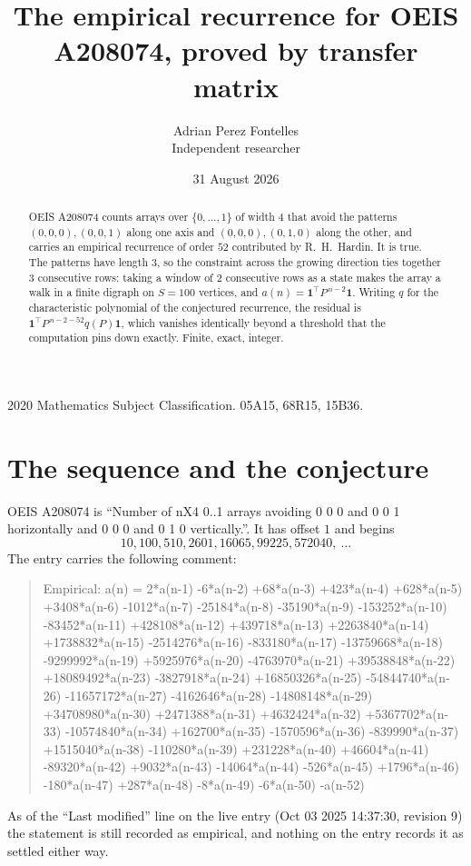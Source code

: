 \documentclass[11pt,a4paper]{article}
\title{The empirical recurrence for OEIS A208074, proved by transfer matrix}
\author{Adrian Perez Fontelles\\ \small Independent researcher}
\date{31 August 2026}
\theoremstyle{plain}
\theoremstyle{definition}
\begin{document}
\maketitle

\begin{abstract}
OEIS A208074 counts arrays over $\{0,\dots,1\}$ of width $4$ that avoid the patterns
$(0,0,0), (0,0,1)$ along one axis and $(0,0,0), (0,1,0)$ along the other, and carries an empirical recurrence of
order $52$ contributed by R.~H.~Hardin. It is true. The patterns have length $3$, so
the constraint across the growing direction ties together $3$ consecutive rows: taking a
window of $2$ consecutive rows as a state makes the array a walk in a finite digraph
on $S=100$ vertices, and $a(n)=\mathbf{1}^{\!\top}P^{\,n-2}\mathbf{1}$. Writing $q$
for the characteristic polynomial of the conjectured recurrence, the residual is
$\mathbf{1}^{\!\top}P^{\,n-2-52}q(P)\mathbf{1}$, which vanishes identically
beyond a threshold that the computation pins down exactly. Finite, exact, integer.
\end{abstract}

\noindent\small 2020 Mathematics Subject Classification. 05A15, 68R15, 15B36.\normalsize

\section{The sequence and the conjecture}

OEIS A208074 is ``Number of nX4 0..1 arrays avoiding 0 0 0 and 0 0 1 horizontally and 0 0 0 and 0 1 0 vertically.''. It has offset
$1$ and begins
\[
10, 100, 510, 2601, 16065, 99225, 572040,\ \dots
\]
The entry carries the following comment:
\begin{quote}\small
Empirical: a(n) = 2*a(n-1) -6*a(n-2) +68*a(n-3) +423*a(n-4) +628*a(n-5) +3408*a(n-6) -1012*a(n-7) -25184*a(n-8) -35190*a(n-9) -153252*a(n-10) -83452*a(n-11) +428108*a(n-12) +439718*a(n-13) +2263840*a(n-14) +1738832*a(n-15) -2514276*a(n-16) -833180*a(n-17) -13759668*a(n-18) -9299992*a(n-19) +5925976*a(n-20) -4763970*a(n-21) +39538848*a(n-22) +18089492*a(n-23) -3827918*a(n-24) +16850326*a(n-25) -54844740*a(n-26) -11657172*a(n-27) -4162646*a(n-28) -14808148*a(n-29) +34708980*a(n-30) +2471388*a(n-31) +4632424*a(n-32) +5367702*a(n-33) -10574840*a(n-34) +162700*a(n-35) -1570596*a(n-36) -839990*a(n-37) +1515040*a(n-38) -110280*a(n-39) +231228*a(n-40) +46604*a(n-41) -89320*a(n-42) +9032*a(n-43) -14064*a(n-44) -526*a(n-45) +1796*a(n-46) -180*a(n-47) +287*a(n-48) -8*a(n-49) -6*a(n-50) -a(n-52)
\end{quote}
As of the ``Last modified'' line on the live entry (Oct 03 2025 14:37:30, revision
9) the statement is still recorded as empirical, and nothing on the entry
records it as settled either way.
\end{document}
